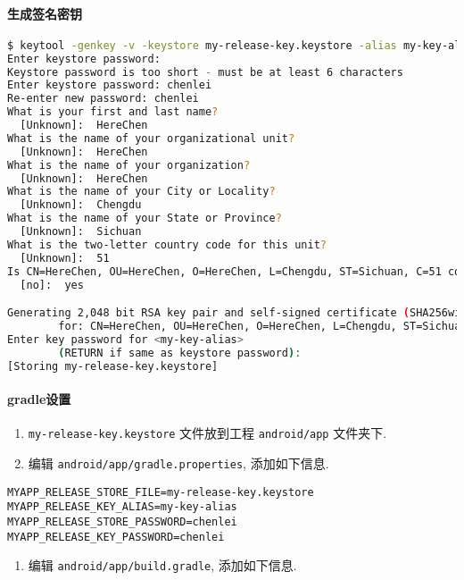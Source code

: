 \paragraph{生成签名密钥}\label{ux751fux6210ux7b7eux540dux5bc6ux94a5}

\begin{lstlisting}[language=bash]
$ keytool -genkey -v -keystore my-release-key.keystore -alias my-key-alias -keyalg RSA -keysize 2048 -validity 10000
Enter keystore password:
Keystore password is too short - must be at least 6 characters
Enter keystore password: chenlei
Re-enter new password: chenlei
What is your first and last name?
  [Unknown]:  HereChen
What is the name of your organizational unit?
  [Unknown]:  HereChen
What is the name of your organization?
  [Unknown]:  HereChen
What is the name of your City or Locality?
  [Unknown]:  Chengdu
What is the name of your State or Province?
  [Unknown]:  Sichuan
What is the two-letter country code for this unit?
  [Unknown]:  51
Is CN=HereChen, OU=HereChen, O=HereChen, L=Chengdu, ST=Sichuan, C=51 correct?
  [no]:  yes

Generating 2,048 bit RSA key pair and self-signed certificate (SHA256withRSA) with a validity of 10,000 days
        for: CN=HereChen, OU=HereChen, O=HereChen, L=Chengdu, ST=Sichuan, C=51
Enter key password for <my-key-alias>
        (RETURN if same as keystore password):
[Storing my-release-key.keystore]
\end{lstlisting}

\paragraph{gradle设置}\label{gradleux8bbeux7f6e}

\begin{enumerate}
\def\labelenumi{\arabic{enumi}.}
\tightlist
\item
  \lstinline!my-release-key.keystore! 文件放到工程
  \lstinline!android/app! 文件夹下.
\item
  编辑 \lstinline!android/app/gradle.properties!, 添加如下信息.
\end{enumerate}

\begin{lstlisting}
MYAPP_RELEASE_STORE_FILE=my-release-key.keystore
MYAPP_RELEASE_KEY_ALIAS=my-key-alias
MYAPP_RELEASE_STORE_PASSWORD=chenlei
MYAPP_RELEASE_KEY_PASSWORD=chenlei
\end{lstlisting}

\begin{enumerate}
\def\labelenumi{\arabic{enumi}.}
\setcounter{enumi}{2}
\tightlist
\item
  编辑 \lstinline!android/app/build.gradle!, 添加如下信息.
\end{enumerate}

